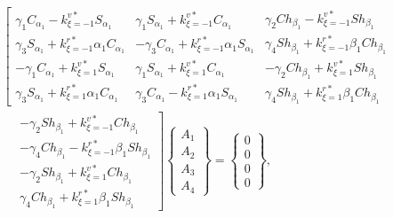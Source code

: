 \documentclass[preprint,12pt,number]{elsarticle}
\begin{document}
\begin{equation}\label{eq:ABx}
\begin{split}
	&\left[ \begin{array}{c}
		\gamma_1 C_{\alpha_1} - k^{v*}_{\xi=-1} S_{\alpha_1} \\ 
		\gamma_3 S_{\alpha_1} + k^{r*}_{\xi=-1} \alpha_1 C_{\alpha_1} \\ 
		-\gamma_1 C_{\alpha_1} + k^{v*}_{\xi=1} S_{\alpha_1} \\ 
		\gamma_3 S_{\alpha_1} + k^{r*}_{\xi=1} \alpha_1 C_{\alpha_1}
	\end{array} 
	\begin{array}{c}
		\gamma_1 S_{\alpha_1} + k^{v*}_{\xi=-1} C_{\alpha_1} \\ 
		-\gamma_3 C_{\alpha_1} + k^{r*}_{\xi=-1} \alpha_1 S_{\alpha_1} \\ 
		\gamma_1 S_{\alpha_1} + k^{v*}_{\xi=1} C_{\alpha_1} \\ 
		\gamma_3 C_{\alpha_1} - k^{r*}_{\xi=1} \alpha_1 S_{\alpha_1}
	\end{array} 
	\begin{array}{c}
		\gamma_2 Ch_{\beta_1} - k^{v*}_{\xi=-1} Sh_{\beta_1} \\ 
		\gamma_4 Sh_{\beta_1} + k^{r*}_{\xi=-1} \beta_1 Ch_{\beta_1} \\ 
		-\gamma_2 Ch_{\beta_1} + k^{v*}_{\xi=1} Sh_{\beta_1} \\ 
		\gamma_4 Sh_{\beta_1} + k^{r*}_{\xi=1} \beta_1 Ch_{\beta_1}
	\end{array} \right. \\ 
	&\quad
	\left. \begin{array}{c}
		-\gamma_2 Sh_{\beta_1} + k^{v*}_{\xi=-1} Ch_{\beta_1} \\ 
		-\gamma_4 Ch_{\beta_1} - k^{r*}_{\xi=-1} \beta_1 Sh_{\beta_1} \\ 
		-\gamma_2 Sh_{\beta_1} + k^{v*}_{\xi=1} Ch_{\beta_1} \\ 
		\gamma_4 Ch_{\beta_1} + k^{r*}_{\xi=1} \beta_1 Sh_{\beta_1}
	\end{array} \right] \begin{Bmatrix}
		A_1 \\ A_2 \\ A_3 \\ A_4
	\end{Bmatrix} =  \begin{Bmatrix}
		0 \\ 0 \\ 0 \\ 0
	\end{Bmatrix},
\end{split}
\end{equation}
\end{document}
